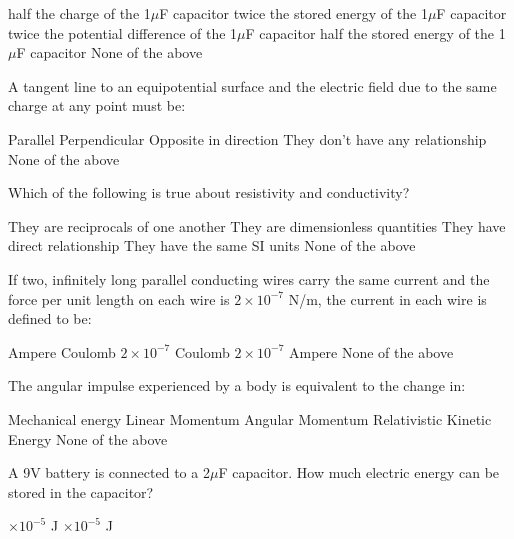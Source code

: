 \documentclass[13pt,addpoints]{exam}
\begin{document}
{{{\begin{questions}
					\begin{oneparchoices}
						\choice half the charge of the 1$\mu$F capacitor
						\choice twice the stored energy of the 1$\mu$F capacitor
						\choice twice the potential difference of the 1$\mu$F capacitor
						\choice half the stored energy of the 1$\mu$F capacitor
						\choice None of the above
					\end{oneparchoices}
					\question A tangent line to an equipotential surface and the electric field due to the same charge at any point must be:\\
					\begin{oneparchoices}
						\choice Parallel
						\choice Perpendicular
						\choice Opposite in direction
						\choice They don't have any relationship
						\choice None of the above
					\end{oneparchoices}
					\question Which of the following is true about resistivity and conductivity?\\
					\begin{oneparchoices}
						\choice They are reciprocals of one another
						\choice They are dimensionless quantities
						\choice They have direct relationship
						\choice They have the same SI units
						\choice None of the above
					\end{oneparchoices}
					\question If two, infinitely long parallel conducting wires carry the same current and the force per unit length on each wire is $2\times10^{-7}$ N/m, the current in each wire is defined to be:\\
					\begin{oneparchoices}
						\choice 1 Ampere
						\choice 1 Coulomb
						\choice $2\times10^{-7}$ Coulomb
						\choice $2\times10^{-7}$ Ampere
						\choice None of the above
					\end{oneparchoices}
					\question The angular impulse experienced by a body is equivalent to the change in:\\
					\begin{oneparchoices}
						\choice Mechanical energy
						\choice Linear Momentum
						\choice Angular Momentum
						\choice Relativistic Kinetic Energy
						\choice None of the above
					\end{oneparchoices}
					\question A 9V battery is connected to a 2$\mu$F capacitor. How much electric energy can be stored in the capacitor?\\
					\begin{oneparchoices}
						$\times10^{-5}$ J
						$\times10^{-5}$ J

\end{oneparchoices}
\end{questions}}}}
\end{document}
